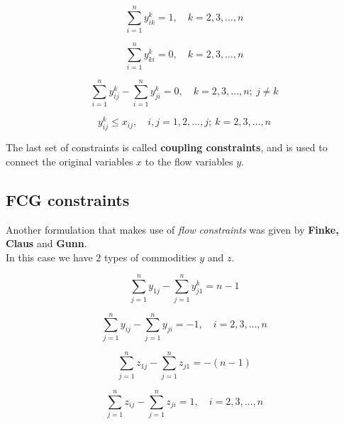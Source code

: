 \documentclass[
12pt,
a4paper,
oneside,
headinclude,
footinclude]{article}
\begin{document}
    \begin{equation}
    {
    \sum_{i=1}^n{y_{ik}^k}=1,\quad k=2,3,\ldots,n
    }
    \end{equation}    
    
    \begin{equation}
    {
    \sum_{i=1}^n{y_{ki}^k}=0,\quad k=2,3,\ldots,n
    }
    \end{equation}   
     
    \begin{equation}
    {
    \sum_{i=1}^n{y_{ij}^k} - \sum_{i=1}^n{y_{ji}^k} = 0,\quad k=2,3,\ldots,n;\ j\neq k
    }
    \end{equation}
    
    \begin{equation}
    {
    y_{ij}^k \leq x_{ij},\quad i,j = 1,2,\ldots,j;\ k=2,3,\ldots,n
    }
    \end{equation} 
    
    The last set of constraints is called \textbf{coupling constraints}, and is used to connect the original variables $x$ to the flow variables $y$.
        
    \subsection{FCG constraints}
    Another formulation that makes use of \textit{flow constraints} was given by \textbf{Finke, Claus} and \textbf{Gunn}.\\
    In this case we have $2$ types of commodities $y$ and $z$.
    
    \begin{equation}
    {
        \sum_{j=1}^n{y_{1j}} - \sum_{j=1}^n{y_{j1}^k} = n-1
    }
    \end{equation}
        
    \begin{equation}
    {
        \sum_{j=1}^n{y_{ij}} - \sum_{j=1}^n{y_{ji}} = -1,\quad i=2,3,\ldots,n
    }
    \end{equation}
    
    \begin{equation}
    {
        \sum_{j=1}^n{z_{1j}} - \sum_{j=1}^n{z_{j1}} = -(n-1)
    }
    \end{equation}
    
    \begin{equation}
    {
        \sum_{j=1}^n{z_{ij}} - \sum_{j=1}^n{z_{ji}} = 1,\quad i=2,3,\ldots,n
    }
    \end{equation}
    
\end{document}
